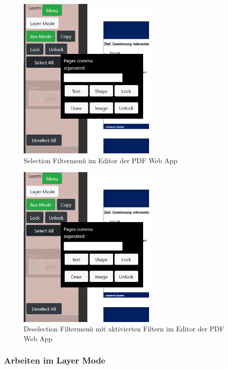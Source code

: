 \begin{figure}[!htbp]
	\centering
	\includegraphics[width=0.6\textwidth]{"images/filtermenu.png"}
	\caption{Selection Filtermenü im Editor der PDF Web App}
	\label{fig:ebenen2}
\end{figure}




\begin{figure}[!htbp]
	\centering
	\includegraphics[width=0.6\textwidth]{"images/filtermenu.png"}
	\caption{Deselection Filtermenü mit aktivierten Filtern im Editor der PDF Web App}
	\label{fig:ebenen2}
\end{figure}


\subsubsection{Arbeiten im Layer Mode}
